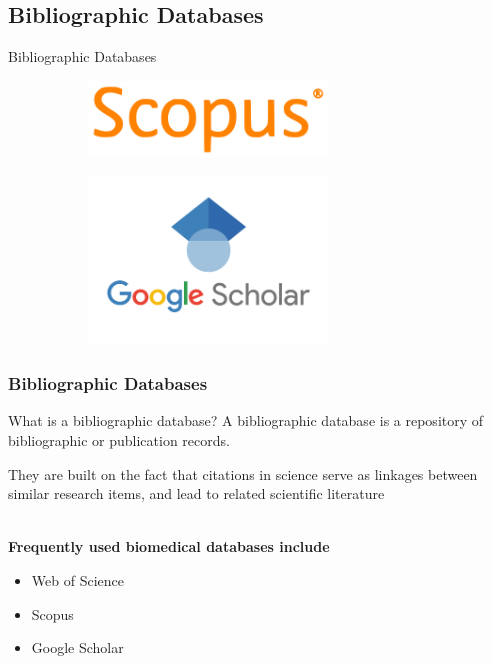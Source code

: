 \documentclass{beamer}
\begin{document}
\subsection{Bibliographic Databases}
\begin{frame}
    \begin{center}
        {\huge Bibliographic Databases}
    \end{center}
    \begin{figure}[h]
        \begin{subfigure}{0.49\textwidth}
            \centering
            \includegraphics[width=0.7\textwidth]{scopus.png}
        \end{subfigure}
        \begin{subfigure}{0.49\textwidth}
            \centering
            \includegraphics[width=0.7\textwidth]{gs.png}
        \end{subfigure}
    \end{figure}
\end{frame}

\begin{frame}
    \frametitle{Bibliographic Databases}

    \begin{block}{What is a bibliographic database?}
        A bibliographic database is a repository of bibliographic or publication records.
    \end{block}

    They are built on the fact that citations in science serve as linkages between similar research items, and lead to related scientific literature\\~\

    \textbf{Frequently used biomedical databases include}
    \begin{itemize}
        \item Web of Science
        \item Scopus
        \item Google Scholar
    \end{itemize}
\end{frame}
\end{document}
